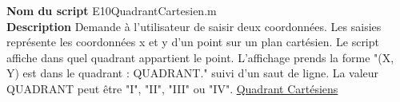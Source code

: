 \textbf{Nom du script}
E10QuadrantCartesien.m\\
\textbf{Description}
Demande à l'utilisateur de saisir deux coordonnées. Les saisies représente les coordonnées x et y d'un point sur un plan cartésien. Le script affiche dans quel quadrant appartient le point. L'affichage prends la forme "(X, Y) est dans le quadrant : QUADRANT." suivi d'un saut de ligne. La valeur QUADRANT peut être "I", "II", "III" ou "IV". \href{https://fr.wikipedia.org/wiki/Quadrant_(mathématiques)}{Quadrant Cartésiens}